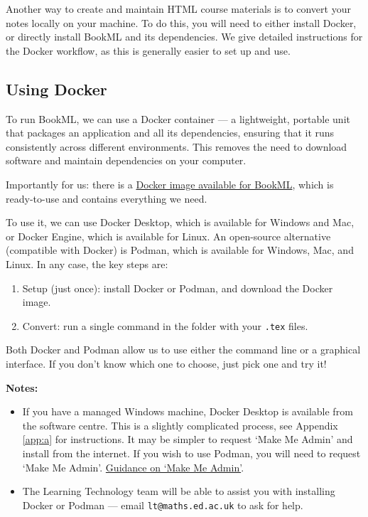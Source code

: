 Another way to create and maintain HTML course materials is to convert your notes locally on your machine. To do this, you will need to either install Docker, or directly install BookML and its dependencies. We give detailed instructions for the Docker workflow, as this is generally easier to set up and use.

\subsection{Using Docker}
\label{ssec:docker}

To run BookML, we can use a Docker container --- a lightweight, portable unit that packages an application and all its dependencies, ensuring that it runs consistently across different environments. This removes the need to download software and maintain dependencies on your computer.

Importantly for us: there is a \href{https://github.com/vlmantova/bookml/pkgs/container/bookml}{Docker image available for BookML}, which is ready-to-use and contains everything we need.

To use it, we can use Docker Desktop, which is available for Windows and Mac, or Docker Engine, which is available for Linux. An open-source alternative (compatible with Docker) is Podman, which is available for Windows, Mac, and Linux. In any case, the key steps are:

\begin{enumerate}
    \item Setup (just once): install Docker or Podman, and download the Docker image.
    \item Convert: run a single command in the folder with your \verb|.tex| files.
\end{enumerate}

Both Docker and Podman allow us to use either the command line or a graphical interface. If you don't know which one to choose, just pick one and try it!

\noindent \textbf{Notes: }
\begin{itemize}
    \item If you have a managed Windows machine, Docker Desktop is available from the software centre. This is a slightly complicated process, 
    see Appendix \ref{app:a} for instructions. It may be simpler to request `Make Me Admin' and install from the internet.
    If you wish to use Podman, you will need to request `Make Me Admin'.
    \href{https://www.ed.ac.uk/information-services/computing/desktop-personal/supported/windows-10/makemeadmin}{Guidance on `Make Me Admin'}.
    \item The Learning Technology team will be able to assist you with installing Docker or Podman --- email \verb|lt@maths.ed.ac.uk| to ask for help.
\end{itemize}

